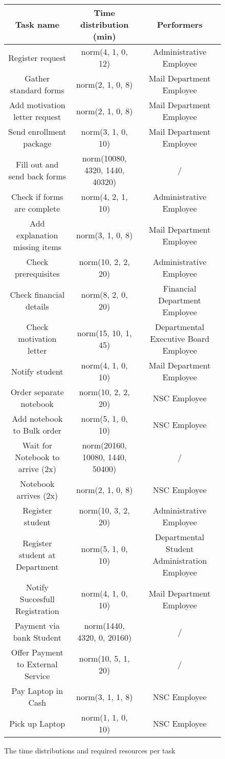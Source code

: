 
\begin{figure}[h!]
	\centering
	\begin{tabular}{ | c | c | c | }
		\hline
		\textbf{Task name} & \textbf{Time distribution (min)} & \textbf{Performers}\\ \hline\hline
		Register request & norm(4, 1, 0, 12) & Administrative Employee \\ \hline
		Gather standard forms & norm(2, 1, 0, 8) & Mail Department Employee \\ \hline
		Add motivation letter request & norm(2, 1, 0, 8) & Mail Department Employee \\ \hline
		Send enrollment package & norm(3, 1, 0, 10) & Mail Department Employee \\ \hline
		Fill out and send back forms & norm(10080, 4320, 1440, 40320) & / \\ \hline
		Check if forms are complete & norm(4, 2, 1, 10) & Administrative Employee \\ \hline
		Add explanation missing items & norm(3, 1, 0, 8) & Mail Department Employee \\ \hline
		Check prerequisites & norm(10, 2, 2, 20) & Administrative Employee \\ \hline
		Check financial details & norm(8, 2, 0, 20) & Financial Department Employee \\ \hline
		Check motivation letter & norm(15, 10, 1, 45) & Departmental Executive Board Employee \\ \hline
		Notify student & norm(4, 1, 0, 10) & Mail Department Employee \\ \hline
		Order separate notebook & norm(10, 2, 2, 20) & NSC Employee \\ \hline
		Add notebook to Bulk order & norm(5, 1, 0, 10) & NSC Employee \\ \hline
		Wait for Notebook to arrive (2x) & norm(20160, 10080, 1440, 50400) & / \\ \hline
		Notebook arrives (2x) & norm(2, 1, 0, 8) & NSC Employee \\ \hline
		Register student & norm(10, 3, 2, 20) & 
		Administrative Employee \\ \hline
		Register student at Department & norm(5, 1, 0, 10) & Departmental Student Administration Employee \\ \hline
		Notify Succesfull Registration & norm(4, 1, 0, 10) & Mail Department Employee \\ \hline
		Payment via bank Student & norm(1440, 4320, 0, 20160) & / \\ \hline
		Offer Payment to External Service & norm(10, 5, 1, 20) & / \\ \hline
		Pay Laptop in Cash & norm(3, 1, 1, 8) & NSC Employee \\ \hline
		Pick up Laptop & norm(1, 1, 0, 10) & NSC Employee \\
		\hline
	\end{tabular}
	\caption{The time distributions and required resources per task}
	\label{fig:tasktimes2}
\end{figure}

